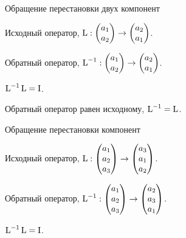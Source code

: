 \begin{frame}{Обращение перестановки двух компонент}

Исходный оператор, $\operatorname{L} : \begin{pmatrix}
  a_1 \\
  a_2 \\
\end{pmatrix} \to
\begin{pmatrix}
a_2 \\
a_1 \\
\end{pmatrix}
$.
\pause

Обратный оператор,  
$\operatorname{L}^{-1} : \begin{pmatrix}
a_1 \\
a_2 \\
    \end{pmatrix} \to
  \begin{pmatrix}
a_2 \\
a_1 \\
    \end{pmatrix}
  $.
\pause

$\operatorname{L}^{-1} \operatorname{L} = \mathrm{I}$.
\pause

Обратный оператор равен исходному, $\operatorname{L}^{-1} = \operatorname{L}$.


\end{frame}
    



\begin{frame}{Обращение перестановки компонент}

Исходный оператор, $\operatorname{L} : \begin{pmatrix}
  a_1 \\
  a_2 \\
  a_3 \\
\end{pmatrix} \to
\begin{pmatrix}
a_3 \\
a_1 \\
a_2 \\
\end{pmatrix}
$.
\pause

Обратный оператор,
$\operatorname{L}^{-1} : \begin{pmatrix}
a_1 \\
a_2 \\
a_3 \\
    \end{pmatrix} \to
  \begin{pmatrix}
a_2 \\
a_3 \\
a_1 \\
    \end{pmatrix}
  $.
\pause

$\operatorname{L}^{-1} \operatorname{L} = \mathrm{I}$.


\end{frame}


